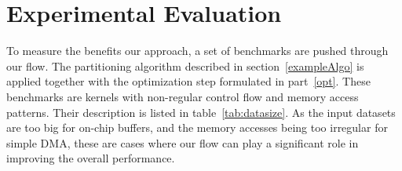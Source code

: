 \documentclass{sig-alternate}
\begin{document}
\begin{algorithm}[t]
\begin{algorithmic}[1]
  
  
  \end{algorithmic}
\end{algorithm}


\section{Experimental Evaluation}
\label{expEval}
To measure the benefits our approach, a set of benchmarks are pushed through our flow. The partitioning algorithm described in section~\ref{exampleAlgo} is applied together with the optimization step formulated in part~\ref{opt}. These benchmarks are kernels with non-regular control flow and memory access patterns. Their description is listed in table~\ref{tab:datasize}. 
As the input datasets are too big for on-chip buffers, and the memory accesses
being too irregular for simple DMA, these are cases where our flow can play a significant role
in improving the overall performance.

\end{document}

